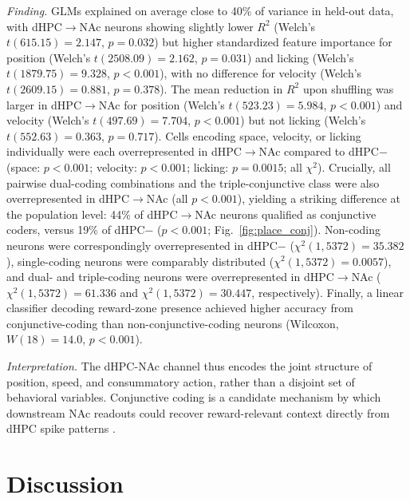 \documentclass[11pt]{article}
\begin{document}
\textit{Finding.} GLMs explained on average close to 40\% of variance in held-out data, with dHPC$\rightarrow$NAc neurons showing slightly lower $R^2$ (Welch's $t(615.15)=2.147$, $p=0.032$) but higher standardized feature importance for position (Welch's $t(2508.09)=2.162$, $p=0.031$) and licking (Welch's $t(1879.75)=9.328$, $p<0.001$), with no difference for velocity (Welch's $t(2609.15)=0.881$, $p=0.378$). The mean reduction in $R^2$ upon shuffling was larger in dHPC$\rightarrow$NAc for position (Welch's $t(523.23)=5.984$, $p<0.001$) and velocity (Welch's $t(497.69)=7.704$, $p<0.001$) but not licking (Welch's $t(552.63)=0.363$, $p=0.717$). Cells encoding space, velocity, or licking individually were each overrepresented in dHPC$\rightarrow$NAc compared to dHPC$-$ (space: $p<0.001$; velocity: $p<0.001$; licking: $p=0.0015$; all $\chi^2$). Crucially, all pairwise dual-coding combinations and the triple-conjunctive class were also overrepresented in dHPC$\rightarrow$NAc (all $p<0.001$), yielding a striking difference at the population level: 44\% of dHPC$\rightarrow$NAc neurons qualified as conjunctive coders, versus 19\% of dHPC$-$ ($p<0.001$; Fig.~\ref{fig:place_conj}). Non-coding neurons were correspondingly overrepresented in dHPC$-$ ($\chi^2(1,5372)=35.382$), single-coding neurons were comparably distributed ($\chi^2(1,5372)=0.0057$), and dual- and triple-coding neurons were overrepresented in dHPC$\rightarrow$NAc ($\chi^2(1,5372)=61.336$ and $\chi^2(1,5372)=30.447$, respectively). Finally, a linear classifier decoding reward-zone presence achieved higher accuracy from conjunctive-coding than non-conjunctive-coding neurons (Wilcoxon, $W(18)=14.0$, $p<0.001$).

\textit{Interpretation.} The dHPC-NAc channel thus encodes the joint structure of position, speed, and consummatory action, rather than a disjoint set of behavioral variables. Conjunctive coding is a candidate mechanism by which downstream NAc readouts could recover reward-relevant context directly from dHPC spike patterns \citep{Xiao2020Conjunctive,Sato2020Overrepresentation}.



\section{Discussion}
\end{document}
